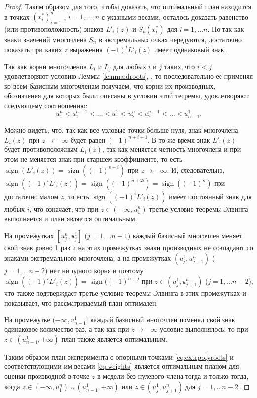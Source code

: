 \documentclass[specialist,
               substylefile = spbu.rtx,
               subf,href,colorlinks=true, 12pt]{disser}
\theoremstyle{definition}
\DeclareMathOperator*{\sign}{sign}
\begin{document}
\begin{proof}
	Таким образом для того, чтобы доказать, что оптимальный план находится в точках $(x_i^*)_{i=1}^n$ , $i = 1, \ldots, n$ с указными весами, осталось доказать равенство (или противоположность) знаков $L'_i(z)$ и $ S_n(x_i^*)$ для $i = 1, \ldots n$. Но так как знаки значений многочлена $S_n$ в экстремальных очках чередуются, достаточно показать при каких $z$ выражения $(-1)^i L'_i(z)$ имеет одинаковый знак.
	
	Так как корни многочленов $L_i$ и $L_j$ для любых $i$ и $j$ таких, что $i < j$ удовлетворяют условию Леммы \ref{lemma:droots}, , то последовательно её применяя ко всем базисным многочленам получаем, что корни их производных, обозначения для которых были описаны в условии этой теоремы, удовлетворяют следующему соотношению:
	\begin{equation*}
		u^n_1 < u^{n-1}_1 < \ldots < u^1_1 < u^n_2 < u^{n-1}_2 < \ldots < u_{n-1}^1.
	\end{equation*}
	
	Можно видеть, что, так как все узловые точки больше нуля, знак многочлена $L_i(z)$ при $z \to -\infty$ будет равен $(-1)^{n+i+1}$. В то же время знак $L'_i(z)$ будет противоположным $L_i(z)$, так как меняется четность многочлена и при этом не меняется знак при старшем коэффициенте, то есть $\sign(L'_i(z)) = \sign((-1)^{n+i})$ при $z \to -\infty$. И, следовательно, $\sign((-1)^i L'_i(z)) = \sign((-1)^{n+2i}) = \sign((-1)^{n})$ при достаточно малом  $z $, то есть $\sign((-1)^i L'_i(z))$  имеет постоянный знак для любых $i$, что означает, что при $z \in (-\infty, u_1^n)$ третье условие теоремы Элвинга выполняется и план является оптимальным.
	
	На промежутках $[u_j^n, u_j^1]$ ($j = 1, \ldots {n-1}$) каждый базисный многочлен меняет свой знак ровно 1 раз и на этих промежутках знаки производных не совпадают со знаками экстремального многочлена, а на промежутках $(u_j^1, u_{j+1}^n)$ ($j=1, \ldots n-2$) нет ни одного корня и поэтому $\sign((-1)^i L'_i(z)) = \sign ((-1)^{n + j}$ при $z \in (u_j^1, u_{j+1}^n)$ ($j=1, \ldots n-2$), что также подтверждает третье условие теоремы Элвинга в этих промежутках и показывает, что рассматриваемый план оптимален.
	
	На промежутке $(-\infty, u_{n-1}^1]$ каждый базисный многочлен поменял свой знак одинаковое количество раз, а так как при $z \to -\infty$ условие выполнялось, то при $z \in (u_{n-1}^1, +\infty)$ план также является оптимальным.
	
	Таким образом план эксперимента с опорными точками \eqref{eq:extrpolyroots} и соответствующими им весами \eqref{eq:weights} является оптимальным планом для оценки производной в точке $z$ в модели без нулевого члена тогда и только тогда, когда $z \in  (-\infty, u_1^n) \cup (u_{n-1}^1, +\infty)$ или $z \in (u_{j}^1, u_{j+1}^n)$ для $j=1, \ldots n-2$.

	\end{proof}
	
\end{document}

